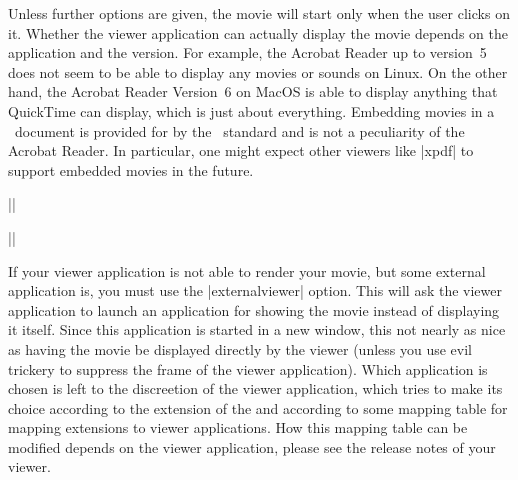 \begin{command}{\movie{}}
  Unless further options are given, the movie will start only when the
  user clicks on it. Whether the viewer application can actually
  display the movie depends on the application and the version. For
  example, the Acrobat Reader up to version~5 does not seem to be able
  to display any movies or sounds on Linux. On the other hand, the
  Acrobat Reader Version~6 on MacOS is able to display anything that
  QuickTime can display, which is just about everything. Embedding
  movies in a \pdf\ document is provided for by the \pdf\ standard and
  is not a peculiarity of the Acrobat Reader. In particular, one might
  expect other viewers like |xpdf| to support embedded movies in the
  future.

  \example
  ||

  \example
  ||

  If your viewer application is not able to render your movie, but
  some external application is, you must use the |externalviewer|
  option. This will ask the viewer application to launch an
  application for showing the movie instead of displaying it
  itself. Since this application is started in a new window, this not
  nearly as nice as having the movie be displayed directly by the
  viewer (unless you use evil trickery to suppress the frame of the
  viewer application). Which application is chosen is left to the
  discreetion of the viewer application, which tries to make its
  choice according to the extension of the  and
  according to some mapping table for mapping extensions
  to viewer applications. How this mapping table can be modified
  depends on the viewer application, please see the release notes of
  your viewer.


\end{command}
